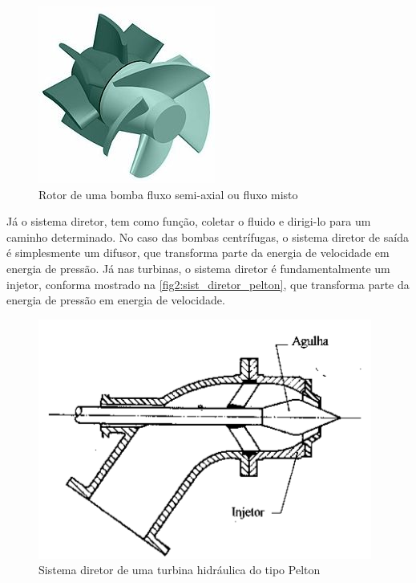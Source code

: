     \begin{figure}[htb]
        \centering
        \caption {\label {fig1:rotor_bomba} Rotor de uma bomba fluxo semi-axial ou fluxo misto}
        \includegraphics[scale=0.65]{images/fig1.png}
    \end{figure}


    Já o sistema diretor, tem como função, coletar o fluido e dirigi-lo para um caminho determinado. No caso das bombas centrífugas, o sistema diretor de saída é simplesmente um difusor, que transforma parte da energia de velocidade em energia de pressão. Já nas turbinas, o sistema diretor é fundamentalmente um injetor, conforma mostrado na \autoref{fig2:sist_diretor_pelton}, que transforma parte da energia de pressão em energia de velocidade.

    \begin{figure}[htb]
        \centering
        \caption {\label {fig2:sist_diretor_pelton} Sistema diretor de uma turbina hidráulica do tipo Pelton}
        \includegraphics[scale=0.5]{images/fig2.png}
    \end{figure}

